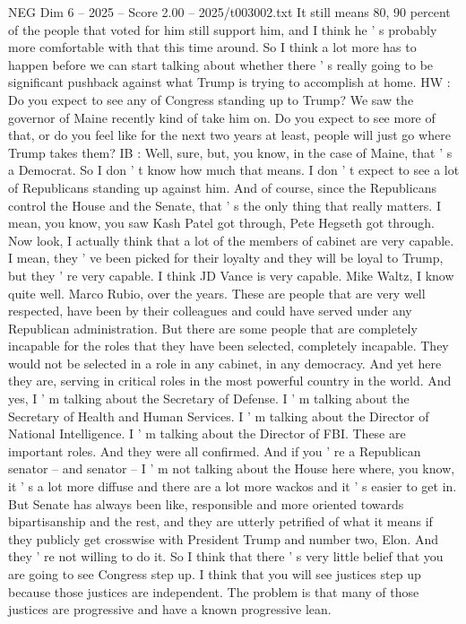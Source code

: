 \begin{textsample}{NEG Dim 6 – 2025 – Score 2.00 – 2025/t003002.txt}
It still means 80, 90 percent of the people that voted for him still support him, and I think he ' s probably more comfortable with that this time around.
So I think a lot more has to happen before we can start talking about whether there ' s really going to be significant pushback against what Trump is trying to accomplish at home.
HW : Do you expect to see any of Congress standing up to Trump?
We saw the governor of Maine recently kind of take him on.
Do you expect to see more of that, or do you feel like for the next two years at least, people will just go where Trump takes them?
IB : Well, sure, but, you know, in the case of Maine, that ' s a Democrat.
So I don ' t know how much that means.
I don ' t expect to see a lot of Republicans standing up against him.
And of course, since the Republicans control the House and the Senate, that ' s the only thing that really matters.
I mean, you know, you saw Kash Patel got through, Pete Hegseth got through.
Now look, I actually think that a lot of the members of cabinet are very capable.
I mean, they ' ve been picked for their loyalty and they will be loyal to Trump, but they ' re very capable.
I think JD Vance is very capable.
Mike Waltz, I know quite well.
Marco Rubio, over the years.
These are people that are very well respected, have been by their colleagues and could have served under any Republican administration.
But there are some people that are completely incapable for the roles that they have been selected, completely incapable.
They would not be selected in a role in any cabinet, in any democracy.
And yet here they are, serving in critical roles in the most powerful country in the world.
And yes, I ' m talking about the Secretary of Defense.
I ' m talking about the Secretary of Health and Human Services.
I ' m talking about the Director of National Intelligence.
I ' m talking about the Director of FBI.
These are important roles.
And they were all confirmed.
And if you ' re a Republican senator -- and senator -- I ' m not talking about the House here where, you know, it ' s a lot more diffuse and there are a lot more wackos and it ' s easier to get in.
But Senate has always been like, responsible and more oriented towards bipartisanship and the rest, and they are utterly petrified of what it means if they publicly get crosswise with President Trump and number two, Elon.
And they ' re not willing to do it.
So I think that there ' s very little belief that you are going to see Congress step up.
I think that you will see justices step up because those justices are independent.
The problem is that many of those justices are progressive and have a known progressive lean.

\end{textsample}
